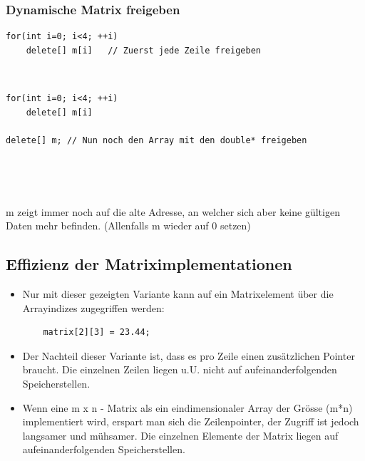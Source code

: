\subsubsection{Dynamische Matrix freigeben}
\label{sec:Dynamische Matrix freigeben}
\noindent
\begin{minipage}{\linewidth}
\begin{lstlisting}
for(int i=0; i<4; ++i)
	delete[] m[i]	// Zuerst jede Zeile freigeben		
\end{lstlisting}
\end{minipage}
\begin{figure}[hh]
	\centering
	
	\\
	
\end{figure}
\vspace{1cm}
\noindent
\begin{minipage}{\linewidth}
\begin{lstlisting}
for(int i=0; i<4; ++i)
	delete[] m[i]

delete[] m;	// Nun noch den Array mit den double* freigeben
\end{lstlisting}
\end{minipage}
\begin{figure}[hh]
	\centering
	
	\\
	
\end{figure}
\\
\vspace{1cm}
\begin{achtung}
m zeigt immer noch auf die alte Adresse, an welcher sich aber keine gültigen Daten mehr befinden. (Allenfalls m wieder auf 0 setzen)
\end{achtung}

\subsection{Effizienz der Matriximplementationen}
\label{sec:Effizienz der Matriximplementationen}
\begin{itemize}
	\item Nur mit dieser gezeigten Variante kann auf ein Matrixelement über die Arrayindizes zugegriffen werden:
	\begin{minipage}{\linewidth}
	\begin{lstlisting}
	matrix[2][3] = 23.44;
	\end{lstlisting}
	\end{minipage}
	\item Der Nachteil dieser Variante ist, dass es pro Zeile einen zusätzlichen Pointer braucht. Die einzelnen Zeilen liegen u.U. nicht auf aufeinanderfolgenden Speicherstellen.
	\item Wenn eine m x n - Matrix als ein eindimensionaler Array der Grösse (m*n) implementiert wird, erspart man sich die Zeilenpointer, der Zugriff ist jedoch langsamer und mühsamer. Die einzelnen Elemente der Matrix liegen auf aufeinanderfolgenden Speicherstellen.
\end{itemize}

